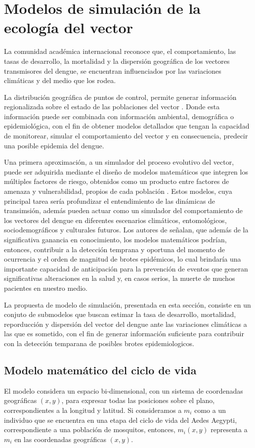 \section{Modelos de simulación de la ecología del vector}
\label{sec:cap4-modelo-simulacion}

La comunidad académica internacional reconoce que, el comportamiento, las tasas de desarrollo, la
mortalidad y la dispersión geográfica de los vectores transmisores del dengue, se encuentran
influenciados por las variaciones climáticas y del medio que los rodea.

La distribución geográfica de puntos de control, permite generar información regionalizada sobre
el estado de las poblaciones del vector \cite{NINO2011}. Donde esta información puede ser
combinada con información ambiental, demográfica o epidemiológica, con el fin de obtener modelos
detallados que tengan la capacidad de monitorear, simular el comportamiento del vector y en
consecuencia, predecir una posible epidemia del dengue.

Una primera aproximación, a un simulador del proceso evolutivo del vector, puede ser adquirida
mediante el diseño de modelos matemáticos que integren los múltiples factores de riesgo, obtenidos
como un producto entre factores de amenaza y vulnerabilidad, propios de cada población
\cite{velez2013hacia}. Estos modelos, cuya principal tarea sería profundizar el entendimiento de
las dinámicas de transimsión, además pueden actuar como un simulador del comportamiento de los
vectores del dengue en diferentes escenarios climáticos, entomológicos, sociodemográficos y
culturales futuros. Los autores de \cite{velez2013hacia} señalan, que además de la significativa
ganancia en conocimiento, los modelos matemáticos podrían, entonces, contribuir a la detección
temprana y oportuna del momento de ocurrencia y el orden de magnitud de brotes epidémicos, lo cual
brindaría una importante capacidad de anticipación para la prevención de eventos que generan
significativas alteraciones en la salud y, en casos serios, la muerte de muchos pacientes en
nuestro medio.

La propuesta de modelo de simulación, presentada en esta sección, consiste en un conjuto de
submodelos que buscan estimar la tasa de desarrollo, mortalidad, reporducción y dispersión del
vector del dengue ante las variaciones climáticas a las que es sometido, con el fin de generar
información suficiente para contribuir con la detección temparana de posibles brotes
epidemiologicos.

\subsection{Modelo matemático del ciclo de vida}
\label{subsec:cap4-modelo-matematico-ciclo-vida}
El modelo considera un espacio bi-dimensional, con un sistema de coordenadas geográficas $(x,y)$,
para expresar todas las posiciones sobre el plano, correspondientes a la longitud y latitud. Si
consideramos a $m_{i}$ como a un individuo que se encuentra en una etapa del ciclo de vida del
Aedes Aegypti, correspondiente a una población de mosquitos, entonces, $m_{i}(x,y)$ representa a
$m_{i}$ en las coordenadas geográficas $(x,y)$.

